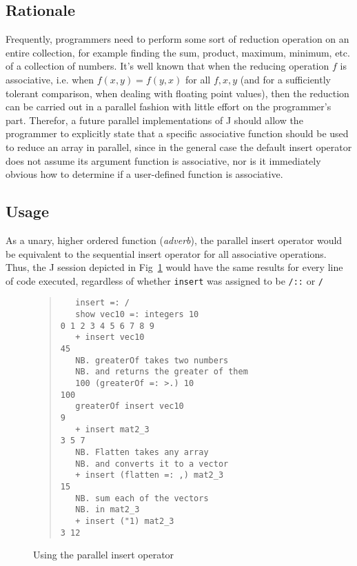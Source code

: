 \subsection{Rationale}
Frequently, programmers need to perform some sort of reduction operation on an entire collection, 
for example finding the sum, product, maximum, minimum, etc. of a collection of numbers.
It's well known that when the reducing operation $f$ is associative, 
i.e. when $f(x,y) = f(y,x)$ for all $f, x, y$ (and for a sufficiently tolerant comparison, when dealing with floating point values),
then the reduction can be carried out in a parallel fashion with little effort on the programmer's part.
Therefor, a future parallel implementations of J should allow the programmer 
to explicitly state that a specific associative function should be used to reduce an array in parallel, 
since in the general case the default insert operator does not assume its argument function is associative, 
nor is it immediately obvious how to determine if a user-defined function is associative.

\subsection{Usage}
As a unary, higher ordered function (\textit{adverb}), 
the parallel insert operator would be equivalent to the sequential insert operator 
for all associative operations. 
Thus, the J session depicted in Fig~\ref{fig::pinsert} would have the same results for every line of code executed, 
regardless of whether \texttt{insert} was assigned to be \texttt{/::} or \texttt{/}

\begin{figure}[h]
\begin{quote}
\begin{singlespacing}
\begin{small}
\begin{verbatim}
   insert =: /
   show vec10 =: integers 10
0 1 2 3 4 5 6 7 8 9
   + insert vec10
45
   NB. greaterOf takes two numbers
   NB. and returns the greater of them
   100 (greaterOf =: >.) 10
100
   greaterOf insert vec10
9
   + insert mat2_3
3 5 7
   NB. Flatten takes any array
   NB. and converts it to a vector
   + insert (flatten =: ,) mat2_3
15
   NB. sum each of the vectors
   NB. in mat2_3
   + insert ("1) mat2_3
3 12
\end{verbatim}
\end{small}
\end{singlespacing}
\end{quote}
\caption{Using the parallel insert operator}
\label{fig::pinsert}
\end{figure}

